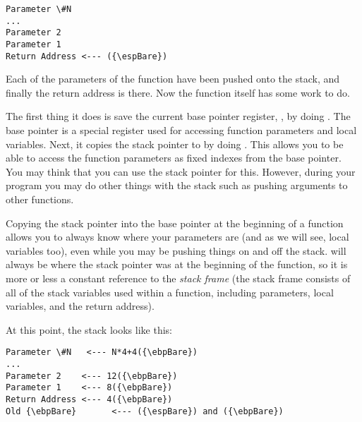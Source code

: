 
\begin{simpletyping}
\begin{lstlisting}
Parameter \#N
...
Parameter 2
Parameter 1
Return Address <--- ({\espBare})
\end{lstlisting}
\end{simpletyping}

Each of the parameters of the function have been pushed onto the stack,
and finally the return address is there.
Now the function itself has some work to do.  

The first thing
it does is save the current base pointer register,
 {\ebpRegIdx}, by doing
.  The base pointer is a special register used for accessing function parameters and local variables.
Next, it copies the stack pointer
to {\ebpRegIdx} by doing .  This 
allows you to be able to access the function parameters
as fixed indexes from the base pointer.  You may think that you can
use the stack pointer for this.  However, during your
program you may do other things with the stack such as pushing
arguments to other functions.

Copying the stack pointer into
the base pointer at the beginning of a function allows you to always 
know where your parameters are (and as we will see, local variables too),
even while you may be pushing things on and off the stack.  {\ebpRegIdx}
will always be where the stack pointer was at the beginning of the function,
so it is more or less a constant reference to the \emph{stack frame} (the stack frame
consists of all of the stack variables used within a function, including 
parameters, local variables, and the return address).

At this point, the stack looks like this:

\begin{simpletyping}
\begin{lstlisting}
Parameter \#N   <--- N*4+4({\ebpBare})
...
Parameter 2    <--- 12({\ebpBare})
Parameter 1    <--- 8({\ebpBare})
Return Address <--- 4({\ebpBare})
Old {\ebpBare}       <--- ({\espBare}) and ({\ebpBare})
\end{lstlisting}
\end{simpletyping}


